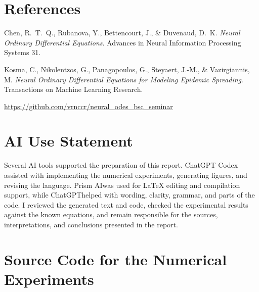 \documentclass[11pt,a4paper]{article}
\begin{document}
\section{References}

{\small
\begin{description}[leftmargin=*,itemsep=2pt]

\item[Chen et al.\ (2018)]
Chen, R.\ T.\ Q., Rubanova, Y., Bettencourt, J., \& Duvenaud, D.\ K.
\emph{Neural Ordinary Differential Equations}.
Advances in Neural Information Processing Systems 31.

\item[Kosma et al.\ (2023)]
Kosma, C., Nikolentzos, G., Panagopoulos, G., Steyaert, J.-M., \&
Vazirgiannis, M.
\emph{Neural Ordinary Differential Equations for Modeling Epidemic Spreading}.
Transactions on Machine Learning Research.

\item[Code and documentation:] \url{https://github.com/vrnccr/neural_odes_bsc_seminar}

\end{description}
}

\section{AI Use Statement}

Several AI tools supported the preparation of this report. ChatGPT Codex
assisted with implementing the numerical experiments, generating figures, and 
revising the language. Prism AIwas used for LaTeX editing and compilation support, 
while ChatGPThelped with wording, clarity, grammar, and parts of the code. I reviewed the
generated text and code, checked the experimental results against the known
equations, and remain responsible for the sources, interpretations, and
conclusions presented in the report.

\clearpage
\appendix
\section{Source Code for the Numerical Experiments}
\label{app:code}
\end{document}

